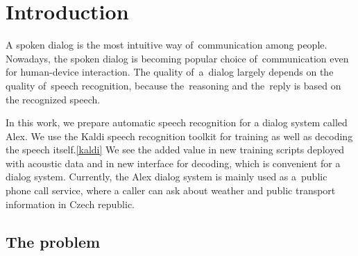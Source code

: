\chapter{Introduction}
\label{chap:intro}

% 
% 
% 

A spoken dialog is the most intuitive way of~communication among people. Nowadays, the spoken dialog is becoming popular 
choice of~communication even for human-device interaction. The quality of~a~dialog largely depends on the quality 
of~speech recognition, because the~reasoning and the~reply is based on the recognized speech. 

In this work, we prepare \acl{automatic speech recognition} for a dialog system called Alex. 
We use the Kaldi speech recognition toolkit for training as well as decoding the speech itself.\ref{kaldi}
We see the added value in new training scripts deployed with acoustic data
and in new interface for decoding, which is convenient for a dialog system. 
Currently, the Alex dialog system is mainly used as a~public phone call service,
where a caller can ask about weather and public transport information in Czech republic.

\section{The problem} 
\label{sec:problem}

